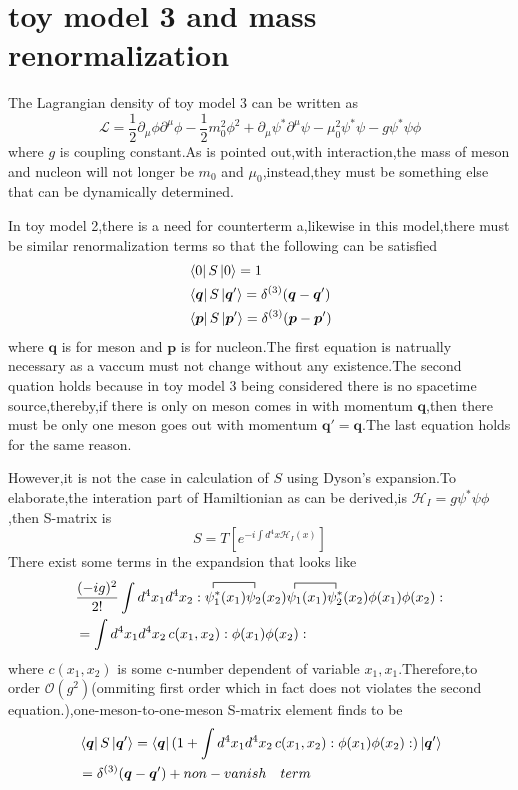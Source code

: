 \documentclass[a4paper]{article}
\begin{document}
\section{toy model 3 and mass renormalization}
The Lagrangian density of toy model 3 can be written as$$\mathscr{L}=\frac{1}{2}\partial_{\mu}\phi\partial^{\mu}\phi-\frac{1}{2}m_0^2\phi^2+\partial_{\mu}\psi^*\partial^{\mu}\psi-\mu_0^2\psi^*\psi-g\psi^*\psi\phi$$where $g$ is coupling constant.As is pointed out,with interaction,the mass of meson and nucleon will not longer be $m_0$ and $\mu_0$,instead,they must be something else that can be dynamically determined.
\par In toy model 2,there is a need for counterterm a,likewise in this model,there must be similar renormalization terms so that the following can be satisfied
\begin{align*}
	&\bra{0}S\ket{0}=1\\
	&\bra{\bm{q}}S\ket{\bm{q}'}=\delta^{(3)}(\bm{q}-\bm{q}')\\
	&\bra{\bm{p}}S\ket{\bm{p}'}=\delta^{(3)}(\bm{p}-\bm{p}')
\end{align*}
where $\bm{q}$ is for meson and $\bm{p}$ is for nucleon.The first equation is natrually necessary as a vaccum must not change without any existence.The second quation holds because in toy model 3 being considered there is no spacetime source,thereby,if there is only on meson comes in with momentum $\bm{q}$,then there must be only one meson goes out with momentum $\bm{q}'=\bm{q}$.The last equation holds for the same reason.
\par However,it is not the case in calculation of $S$ using Dyson's expansion.To elaborate,the interation part of Hamiltionian as can be derived,is $\mathscr{H}_I=g\psi^*\psi\phi$,then S-matrix is$$S=T[e^{-i\int d^4x\mathscr{H}_I(x)}]$$
There exist some terms in the expandsion that looks like
\begin{align*}
&\frac{(-ig)^2}{2!}\int d^4x_1d^4x_2:\contraction{ }{\psi_1^*}{(x_1)}{\psi_2}\psi_1^*(x_1)\psi_2(x_2)\contraction{ }{\psi_1}{(x_1)}{\psi_2}\psi_1(x_1)\psi_2^*(x_2)\phi(x_1)\phi(x_2):\\
&=\int d^4x_1d^4x_2\,c(x_1,x_2):\phi(x_1)\phi(x_2):
\end{align*}
where $c(x_1,x_2)$ is some c-number dependent of variable $x_1,x_1$.Therefore,to order $\mathscr{O}(g^2)$(ommiting first order which in fact does not violates the second equation.),one-meson-to-one-meson S-matrix element finds to be
\begin{align*}
	&\bra{\bm{q}}S\ket{\bm{q}'}=\bra{\bm{q}}(1+\int d^4x_1d^4x_2\,c(x_1,x_2):\phi(x_1)\phi(x_2):)\ket{\bm{q}'}\\
	&=\delta^{(3)}(\bm{q}-\bm{q}')+non-vanish\quad term
\end{align*}
\end{document}
